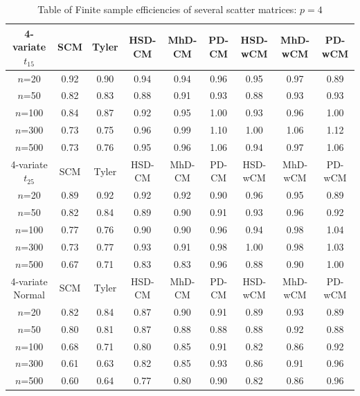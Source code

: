 \documentclass[fleqn,12pt]{article}
\begin{document}
\begin{table}
\begin{footnotesize}
\begin{tabular}{c|cc|ccc|ccc}
    4-variate $t_{15}$ & SCM  & Tyler & HSD-CM & MhD-CM & PD-CM & HSD-wCM & MhD-wCM & PD-wCM \\ \hline
    $n$=20             & 0.92 & 0.90  & 0.94   & 0.94   & 0.96  & 0.95    & 0.97    & 0.89   \\
    $n$=50             & 0.82 & 0.83  & 0.88   & 0.91   & 0.93  & 0.88    & 0.93    & 0.93   \\
    $n$=100            & 0.84 & 0.87  & 0.92   & 0.95   & 1.00  & 0.93    & 0.96    & 1.00   \\
    $n$=300            & 0.73 & 0.75  & 0.96   & 0.99   & 1.10  & 1.00    & 1.06    & 1.12   \\
    $n$=500            & 0.73 & 0.76  & 0.95   & 0.96   & 1.06  & 0.94    & 0.97    & 1.06   \\ \hline
    4-variate $t_{25}$ & SCM  & Tyler & HSD-CM & MhD-CM & PD-CM & HSD-wCM & MhD-wCM & PD-wCM \\ \hline
    $n$=20             & 0.89 & 0.92  & 0.92   & 0.92   & 0.90  & 0.96    & 0.95    & 0.89   \\
    $n$=50             & 0.82 & 0.84  & 0.89   & 0.90   & 0.91  & 0.93    & 0.96    & 0.92   \\
    $n$=100            & 0.77 & 0.76  & 0.90   & 0.90   & 0.96  & 0.94    & 0.98    & 1.04   \\
    $n$=300            & 0.73 & 0.77  & 0.93   & 0.91   & 0.98  & 1.00    & 0.98    & 1.03   \\
    $n$=500            & 0.67 & 0.71  & 0.83   & 0.83   & 0.96  & 0.88    & 0.90    & 1.00   \\ \hline
    4-variate Normal   & SCM  & Tyler & HSD-CM & MhD-CM & PD-CM & HSD-wCM & MhD-wCM & PD-wCM \\ \hline
    $n$=20             & 0.82 & 0.84  & 0.87   & 0.90   & 0.91  & 0.89    & 0.93    & 0.89   \\
    $n$=50             & 0.80 & 0.81  & 0.87   & 0.88   & 0.88  & 0.88    & 0.92    & 0.88   \\
    $n$=100            & 0.68 & 0.71  & 0.80   & 0.85   & 0.91  & 0.82    & 0.86    & 0.92   \\
    $n$=300            & 0.61 & 0.63  & 0.82   & 0.85   & 0.93  & 0.86    & 0.91    & 0.96   \\
    $n$=500            & 0.60 & 0.64  & 0.77   & 0.80   & 0.90  & 0.82    & 0.86    & 0.96   \\ \hline
    \end{tabular}
\end{footnotesize}
\caption{Table of Finite sample efficiencies of several scatter matrices: $p=4$}
\label{table:FSEtable4}
\end{table}
\end{document}

